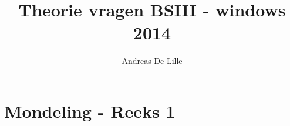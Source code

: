 \documentclass[11pt,a4paper,oneside]{book}
\begin{document}
\title{Theorie vragen BSIII - windows 2014}
\author{Andreas De Lille}
\renewcommand{\today}{Augustus 2014}
\maketitle

\frontmatter
\renewcommand{\baselinestretch}{1.08} 	%
\small\normalsize                       %
\tableofcontents
\renewcommand{\baselinestretch}{1.2} 	%
\small\normalsize                       %

\mainmatter
\part{Mondeling - Reeks 1}



\end{document}
